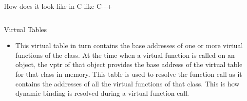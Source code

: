 \begin{frame}[fragile]{How does it look like in C like C++}
    \begin{columns}[T]
    \end{columns}
\end{frame}


\begin{frame}{Virtual Tables} 
    \begin{itemize}
        \item This virtual table in turn contains the base addresses of one or more virtual functions of the class. At the time when a virtual function is 
            called on an object, the vptr of that object provides the base address of the virtual table for that class in memory. This table is used to resolve 
            the function call as it contains the addresses of all the virtual functions of that class. This is how dynamic binding is resolved during a virtual 
            function call.
    \end{itemize}
\end{frame}


